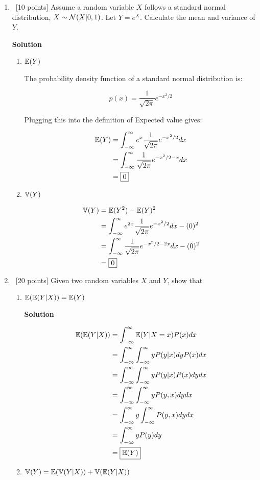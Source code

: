 \documentclass[12pt, fullpage,letterpaper]{article}
\newcommand{\solution}{\textbf{\large Solution}}
\begin{document}
\begin{enumerate}
\label{sec:q5}   
\item~[10 points] Assume a random variable $X$ follows a standard normal distribution, \ie $X \sim \mathcal{N}(X|0, 1)$. Let $Y = e^X$. Calculate the mean and variance of $Y$.

\solution

\begin{enumerate}
	\item $\mathbb{E}(Y)$
	
	The probability density function of a standard normal distribution is:
	
	$$p(x) = \frac{1}{\sqrt{2 \pi}} e^{-x^2 / 2}$$
	
	Plugging this into the definition of Expected value gives:
	
	\[
		\begin{split}
			\mathbb{E}(Y) &= \int_{-\infty}^{\infty} e^x \frac{1}{\sqrt{2 \pi}} e^{-x^2 / 2} dx
			\\
			&= \int_{-\infty}^{\infty} \frac{1}{\sqrt{2 \pi}} e^{-x^2 / 2 - x} dx
			\\
			&= \boxed{0}
		\end{split}	
	\]
	
	\item $\mathbb{V}(Y)$
	
	\[
		\begin{split}
			\mathbb{V}(Y) &= \mathbb{E}(Y^2) - \mathbb{E}(Y)^2
				\\
				&= 	\int_{-\infty}^{\infty} e^{2x} \frac{1}{\sqrt{2 \pi}} e^{-x^2 / 2} dx - (0)^2
				\\
				&= \int_{-\infty}^{\infty} \frac{1}{\sqrt{2 \pi}} e^{-x^2 / 2 - 2x} dx - (0)^2
				\\
				&= \boxed{0}
		\end{split}	
	\]
	
	
\end{enumerate}

\label{sec:q6}
\item~[20 points]  Given two random variables $X$ and $Y$, show that 
\begin{enumerate}
\item $\mathbb{E}(\mathbb{E}(Y|X)) = \mathbb{E}(Y)$

\solution

\[
	\begin{split}
		\mathbb{E}(\mathbb{E}(Y|X)) &= \int_{-\infty}^{\infty} \mathbb{E}(Y|X=x) P(x)dx
			\\
			&= \int_{-\infty}^{\infty} \int_{-\infty}^{\infty} y P(y|x) dy P(x) dx
			\\
			&= \int_{-\infty}^{\infty} \int_{-\infty}^{\infty} y P(y|x) P(x) dy dx
			\\
			&= \int_{-\infty}^{\infty} \int_{-\infty}^{\infty} y P(y,x) dy dx
			\\
			&= \int_{-\infty}^{\infty} y \int_{-\infty}^{\infty}  P(y,x) dy dx
			\\
			&= \int_{-\infty}^{\infty} y P(y) dy
			\\
			&= \boxed{\mathbb{E}(Y)}
	\end{split}
\]
\item
$\mathbb{V}(Y) = \mathbb{E}(\mathbb{V}(Y|X)) + \mathbb{V}(\mathbb{E}(Y|X))$


\end{enumerate}
\end{enumerate}
\end{document}
